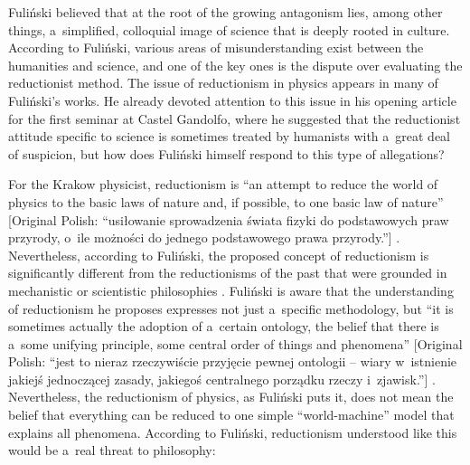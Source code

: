 Fuliński believed that at the root of the growing antagonism lies, among other things, a~simplified, colloquial image of science that is deeply rooted in culture. According to Fuliński, various areas of misunderstanding exist between the humanities and science, and one of the key ones is the dispute over evaluating the reductionist method. The issue of reductionism in physics appears in many of Fuliński's works. He already devoted attention to this issue in his opening article for the first seminar at Castel Gandolfo, where he suggested that the reductionist attitude specific to science is sometimes treated by humanists with a~great deal of suspicion, but how does Fuliński himself respond to this type of allegations?



For the Krakow physicist, reductionism is ``an attempt to reduce the world of physics to the basic laws of nature and, if possible, to one basic law of nature'' [Original Polish: ``usiłowanie sprowadzenia świata fizyki do podstawowych praw przyrody, o~ile możności do jednego podstawowego prawa przyrody.''] 
\parencite[][p.187]{heller_watpliwosci_1990}. %
 Nevertheless, according to Fuliński, the proposed concept of reductionism is significantly different from the reductionisms of the past that were grounded in mechanistic or scientistic philosophies 
\parencites[][]{fulinski_o_1993}[][]{heller_jednosc_2003-2}. %
 Fuliński is aware that the understanding of reductionism he proposes expresses not just a~specific methodology, but ``it is sometimes actually the adoption of a~certain ontology, the belief that there is a~some unifying principle, some central order of things and phenomena'' [Original Polish: ``jest to nieraz rzeczywiście przyjęcie pewnej ontologii -- wiary w~istnienie jakiejś jednoczącej zasady, jakiegoś centralnego porządku rzeczy i~zjawisk.''] 
\parencite[][p.36]{janik_czesc_1990}. %
 Nevertheless, the reductionism of physics, as Fuliński puts it, does not mean the belief that everything can be reduced to one simple ``world-machine'' model that explains all phenomena. According to Fuliński, reductionism understood like this would be a~real threat to philosophy:



